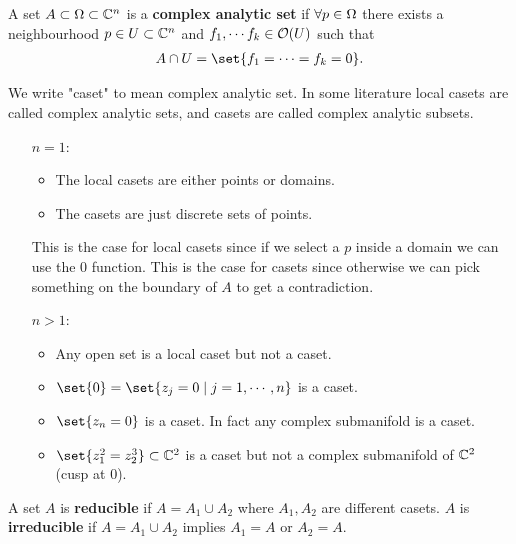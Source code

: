 \begin{definition}
    A set $A \subset \Omega \subset \mathbb{C}^n$ is a \textbf{complex analytic set} if $\forall p \in \Omega$ there exists a neighbourhood $ p \in U \subset \mathbb{C}^n$ and $f_1 , \cdots f_k \in \mathcal{O}(U)$ such that
    \begin{align*}
        A \cap U = \set{ f_1 = \cdots = f_k = 0}.
    \end{align*}
\end{definition}

\begin{remark}
    We write "caset" to mean complex analytic set. In some literature local casets are called complex analytic sets, and casets are called complex analytic subsets.
\end{remark}

\begin{example}
    \hphantom{.}
\begin{itemize}
    \item[$n=1$:] \begin{itemize}
        \item The local casets are either points or domains.
        \item The casets are just discrete sets of points.
    \end{itemize}
    This is the case for local casets since if we select a $p$ inside a domain we can use the $0$ function. This is the case for casets since otherwise we can pick something on the boundary of $A$ to get a contradiction. 
    \item[$n>1$:] \begin{itemize}
        \item Any open set is a local caset but not a caset.
        \item $\set{0} = \set{z_j = 0 \mid j = 1 ,\cdots, n}$ is a caset.
        \item $\set{z_n = 0}$ is a caset. In fact any complex submanifold is a caset.
        \item $\set{z_1^2 = z_2^3} \subset \C^2$ is a caset but not a complex submanifold of $\mathbb{C}^2$ (cusp at $0$). 
    \end{itemize}
\end{itemize}
\end{example}

\begin{definition}
    A set $A$ is \textbf{reducible} if $A = A_1 \cup A_2$ where $A_1, A_2$ are different casets. $A$ is \textbf{irreducible} if $A = A_1 \cup A_2$ implies $A_1 = A$ or $A_2 = A$.
\end{definition}

